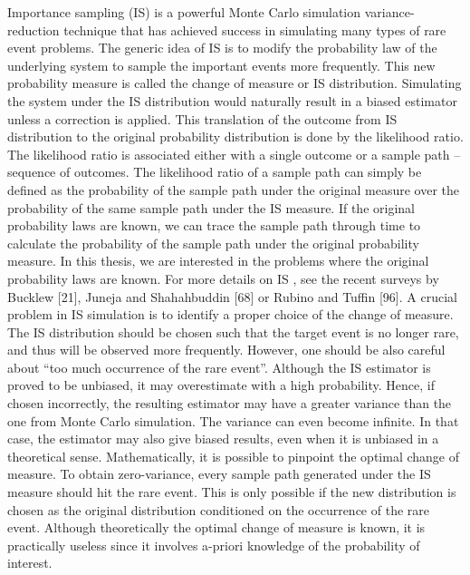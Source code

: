 Importance sampling (IS) is a powerful Monte Carlo simulation variance-reduction technique
that has achieved success in simulating many types of rare event problems.  The generic idea
of  IS  is  to  modify  the  probability  law  of  the  underlying  system  to  sample  the  important
events  more  frequently.   This  new  probability  measure  is  called  the  change  of  measure  or
IS distribution.  Simulating the system under the IS distribution would naturally result in
a biased estimator unless a correction is applied.  This translation of the outcome from IS
distribution  to  the  original  probability  distribution  is  done  by  the  likelihood  ratio.   The
likelihood ratio is associated either with a single outcome or a sample path – sequence of
outcomes.  The likelihood ratio of a sample path can simply be defined as the probability
of  the  sample  path  under  the  original  measure  over  the  probability  of  the
same
sample
path  under  the  IS  measure.   If  the  original  probability  laws  are  known,  we  can  trace  the
sample path through time to calculate the probability of the sample path under the original
probability  measure.   In  this  thesis,  we  are  interested  in  the  problems  where  the  original
probability laws are known.  For more details on IS , see the recent surveys by Bucklew [21],
Juneja and Shahahbuddin [68] or Rubino and Tuffin [96].
A crucial problem in IS simulation is to identify a proper choice of the change of measure.
The IS distribution should be chosen such that the target event is no longer rare, and thus
will  be  observed  more  frequently.   However,  one  should  be  also  careful  about  “too  much
occurrence of the rare event”.  Although the IS estimator is proved to be unbiased, it may
overestimate with a high probability.  Hence,  if chosen incorrectly,  the resulting estimator
may have a greater variance than the one from Monte Carlo simulation.  The variance can
even become infinite.  In that case, the estimator may also give biased results, even when it
is unbiased in a theoretical sense.
Mathematically,  it  is  possible  to  pinpoint  the  optimal  change  of  measure.   To  obtain
zero-variance, every sample path generated under the IS measure should hit the rare event.
This is only possible if the new distribution is chosen as the original distribution conditioned
on the occurrence of the rare event.  Although theoretically the optimal change of measure
is known,  it is practically useless since it involves a-priori knowledge of the probability of
interest.

